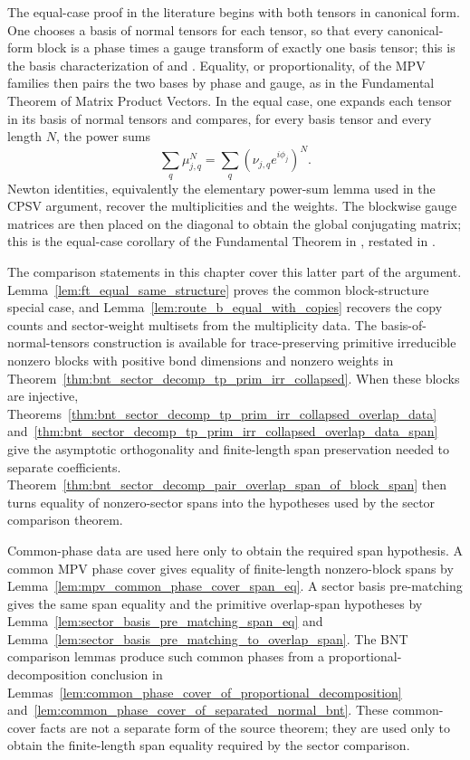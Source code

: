 \begin{remark}\notready
	The equal-case proof in the literature begins with both tensors in canonical
	form.  One chooses a basis of normal tensors for each tensor, so that every
	canonical-form block is a phase times a gauge transform of exactly one basis
	tensor; this is the basis characterization of
	\cite{Cirac2021Matrix} and \cite{Cirac2016MPDO_arXiv}.
	Equality, or proportionality, of the MPV families then pairs the two bases by
	phase and gauge, as in the Fundamental Theorem of Matrix Product Vectors.
	In the equal case, one expands each tensor in its basis of normal tensors and
	compares, for every basis tensor and every length $N$, the power sums
	\[
		\sum_q \mu_{j,q}^N = \sum_q (\nu_{j,q}e^{i\phi_j})^N.
	\]
	Newton identities, equivalently the elementary power-sum lemma used in the
	CPSV argument, recover the multiplicities and the weights.  The blockwise gauge
	matrices are then placed on the diagonal to obtain the global conjugating
	matrix; this is the equal-case corollary of the Fundamental Theorem in
	\cite{Cirac2016MPDO_arXiv}, restated in \cite{Cirac2021Matrix}.

	The comparison statements in this chapter cover this latter part of the
	argument.  Lemma~\ref{lem:ft_equal_same_structure} proves the common block-structure
	special case, and Lemma~\ref{lem:route_b_equal_with_copies} recovers the
	copy counts and sector-weight multisets from the multiplicity data.  The
	basis-of-normal-tensors construction
	is available for trace-preserving primitive irreducible nonzero blocks with
	positive bond dimensions and nonzero weights in
	Theorem~\ref{thm:bnt_sector_decomp_tp_prim_irr_collapsed}.  When these blocks
	are injective,
	Theorems~\ref{thm:bnt_sector_decomp_tp_prim_irr_collapsed_overlap_data}
	and~\ref{thm:bnt_sector_decomp_tp_prim_irr_collapsed_overlap_data_span}
	give the asymptotic orthogonality and finite-length span preservation needed to
	separate coefficients.  Theorem~\ref{thm:bnt_sector_decomp_pair_overlap_span_of_block_span}
	then turns equality of nonzero-sector spans into the hypotheses used by the
	sector comparison theorem.

	Common-phase data are used here only to obtain the required span hypothesis.  A common
	MPV phase cover gives equality of finite-length nonzero-block spans by
	Lemma~\ref{lem:mpv_common_phase_cover_span_eq}.  A sector basis pre-matching
	gives the same span equality and the primitive overlap-span hypotheses by
	Lemma~\ref{lem:sector_basis_pre_matching_span_eq} and
	Lemma~\ref{lem:sector_basis_pre_matching_to_overlap_span}.  The BNT comparison
	lemmas produce such common phases from a proportional-decomposition conclusion in
	Lemmas~\ref{lem:common_phase_cover_of_proportional_decomposition}
	and~\ref{lem:common_phase_cover_of_separated_normal_bnt}.  These common-cover
	facts are not a separate form of the source theorem; they are used only to
	obtain the finite-length span equality required by the sector comparison.


\end{remark}
